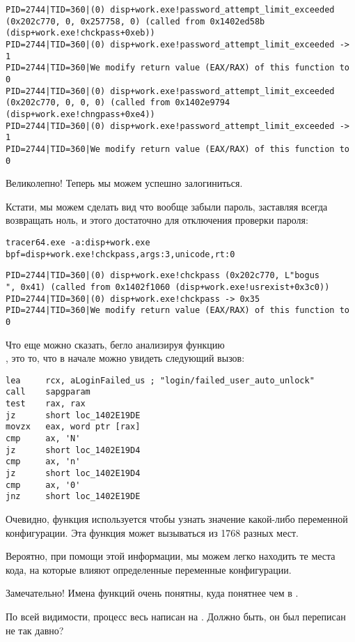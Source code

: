 \begin{lstlisting}
PID=2744|TID=360|(0) disp+work.exe!password_attempt_limit_exceeded (0x202c770, 0, 0x257758, 0) (called from 0x1402ed58b (disp+work.exe!chckpass+0xeb))
PID=2744|TID=360|(0) disp+work.exe!password_attempt_limit_exceeded -> 1
PID=2744|TID=360|We modify return value (EAX/RAX) of this function to 0
PID=2744|TID=360|(0) disp+work.exe!password_attempt_limit_exceeded (0x202c770, 0, 0, 0) (called from 0x1402e9794 (disp+work.exe!chngpass+0xe4))
PID=2744|TID=360|(0) disp+work.exe!password_attempt_limit_exceeded -> 1
PID=2744|TID=360|We modify return value (EAX/RAX) of this function to 0
\end{lstlisting}

Великолепно! Теперь мы можем успешно залогиниться.

Кстати, мы можем сделать вид что вообще забыли пароль, заставляя  всегда возвращать ноль, и этого достаточно для отключения проверки пароля:

\begin{lstlisting}
tracer64.exe -a:disp+work.exe bpf=disp+work.exe!chckpass,args:3,unicode,rt:0
\end{lstlisting}

\begin{lstlisting}
PID=2744|TID=360|(0) disp+work.exe!chckpass (0x202c770, L"bogus                                   ", 0x41) (called from 0x1402f1060 (disp+work.exe!usrexist+0x3c0))
PID=2744|TID=360|(0) disp+work.exe!chckpass -> 0x35
PID=2744|TID=360|We modify return value (EAX/RAX) of this function to 0
\end{lstlisting}

Что еще можно сказать, бегло анализируя функцию \\
, это то, что в начале
можно увидеть следующий вызов:

\begin{lstlisting}
lea     rcx, aLoginFailed_us ; "login/failed_user_auto_unlock"
call    sapgparam
test    rax, rax
jz      short loc_1402E19DE
movzx   eax, word ptr [rax]
cmp     ax, 'N'
jz      short loc_1402E19D4
cmp     ax, 'n'
jz      short loc_1402E19D4
cmp     ax, '0'
jnz     short loc_1402E19DE
\end{lstlisting}

Очевидно, функция  используется чтобы узнать значение какой-либо переменной конфигурации. Эта функция может вызываться из 1768 разных мест.

Вероятно, при помощи этой информации, мы можем легко находить те места кода, на которые влияют определенные переменные конфигурации.

Замечательно! Имена функций очень понятны, куда понятнее чем в \oracle.
 
\myindex{\Cpp}
По всей видимости, процесс  весь написан на \Cpp. Должно быть, он был переписан не так давно?

